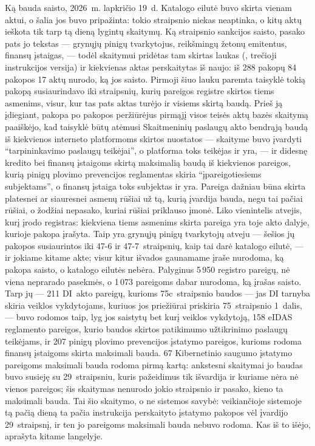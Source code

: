 \begin{lessonbox}{Ką bauda saisto, 2026~m. lapkričio 19~d.}
Katalogo eilutė buvo skirta vienam aktui, o šalia jos buvo pripažinta: tokio straipsnio niekas
neaptinka, o kitų aktų ieškota tik tarp tą dieną lygintų skaitymų. Ką straipsnio sankcijos
saisto, pasako pats jo tekstas --- grynųjų pinigų tvarkytojus, reikšmingų žetonų emitentus,
finansų įstaigas, --- todėl skaitymui pridėtas tam skirtas laukas (, trečioji
instrukcijos versija) ir kiekvienas aktas perskaitytas iš naujo: iš 288 pakopų 84 pakopos 17
aktų nurodo, ką jos saisto. Pirmoji šiuo lauku paremta taisyklė tokią pakopą susiaurindavo iki
straipsnių, kurių pareigos registre skirtos tiems asmenims, visur, kur tas pats aktas turėjo ir
visiems skirtą baudą. Prieš ją įdiegiant, pakopa po pakopos peržiūrėjus pirmąjį visos teisės
aktų bazės skaitymą paaiškėjo, kad taisyklė būtų atėmusi Skaitmeninių paslaugų akto bendrąją
baudą iš kiekvienos interneto platformoms skirtos nuostatos --- skaityme buvo įvardyti
\enquote{tarpininkavimo paslaugų teikėjai}, o platforma toks teikėjas ir yra, --- ir didesnę
kredito bei finansų įstaigoms skirtą maksimalią baudą iš kiekvienos pareigos, kurią pinigų
plovimo prevencijos reglamentas skiria \enquote{įpareigotiesiems subjektams}, o finansų įstaiga
toks subjektas ir yra. Pareiga dažniau būna skirta platesnei ar siauresnei asmenų rūšiai už
tą, kurią įvardija bauda, negu tai pačiai rūšiai, o žodžiai nepasako, kuriai rūšiai priklauso
įmonė. Liko
vienintelis atvejis, kurį įrodo registras: kiekviena tiems asmenims skirta pareiga yra toje akto
dalyje, kurioje pakopa įrašyta. Taip yra grynųjų pinigų tvarkytojų atveju --- šešios jų pakopos
susiaurintos iki 47-6 ir 47-7~straipsnių, kaip tai darė katalogo eilutė, --- ir jokiame kitame
akte; visur kitur išvados gaunamame įraše nurodoma, ką pakopa saisto, o katalogo eilutės nebėra.
Palyginus 5\,950 registro pareigų, nė viena neprarado pasekmės, o 1\,073 pareigoms dabar
nurodoma, ką įrašas saisto. Tarp jų --- 211 DI~akto pareigų, kurioms 75c~straipsnio baudos ---
jas DI tarnyba skiria veiklos vykdytojams, kuriuos jos priežiūrai priskiria 75~straipsnio
1~dalis, --- buvo rodomos taip, lyg jos saistytų bet kurį veiklos vykdytoją, 158 eIDAS
reglamento pareigos, kurio baudos skirtos patikimumo užtikrinimo paslaugų teikėjams, ir 207
pinigų plovimo prevencijos įstatymo pareigos, kurioms rodoma finansų įstaigoms skirta maksimali
bauda. 67 Kibernetinio saugumo įstatymo pareigoms maksimali bauda rodoma pirmą kartą: ankstesni
skaitymai jo baudas buvo susieję su 29~straipsniu, kuris pažeidimus tik išvardija ir kuriame
nėra nė vienos pareigos; šis skaitymas nenurodo jokio straipsnio ir pasako, kieno ta maksimali
bauda. Tai šio skaitymo, o ne sistemos savybė: veikiančioje sistemoje tą pačią dieną ta pačia
instrukcija perskaityto įstatymo pakopos vėl įvardijo 29~straipsnį, ir ten jo pareigoms
maksimali bauda nebuvo rodoma. Kas iš to išėjo, aprašyta kitame langelyje.
\end{lessonbox}

